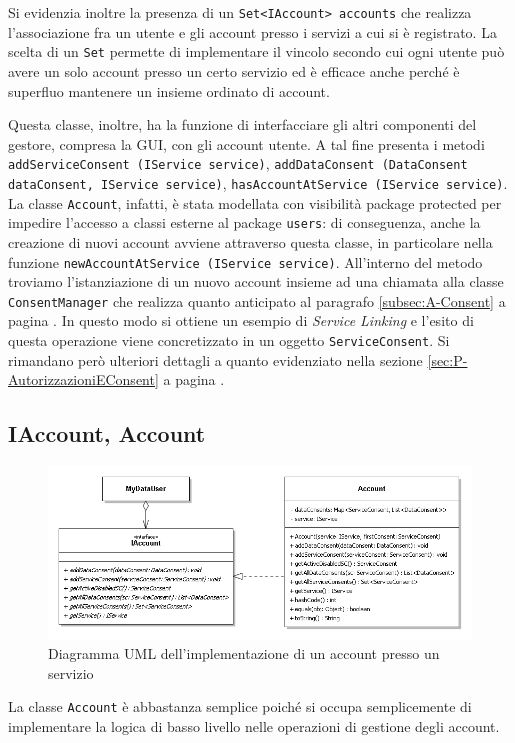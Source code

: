 Si evidenzia inoltre la presenza di un \texttt{Set<IAccount> accounts} che realizza l’associazione fra un utente e gli account presso i servizi a cui si \`e registrato. La scelta di un \texttt{Set} permette di implementare il vincolo secondo cui ogni utente pu\`o avere un solo account presso un certo servizio ed \`e efficace anche perch\'e \`e superfluo mantenere un insieme ordinato di account.

Questa classe, inoltre, ha la funzione di interfacciare gli altri componenti del gestore, compresa la GUI, con gli account utente. A tal fine presenta i metodi \texttt{addServiceConsent (IService service)}, \texttt{addDataConsent (DataConsent dataConsent, IService service)}, \texttt{hasAccountAtService (IService service)}.  La classe \texttt{Account}, infatti, \`e stata modellata con visibilit\`a package protected per impedire l’accesso a classi esterne al package \texttt{users}: di conseguenza, anche la creazione di nuovi account avviene attraverso questa classe, in particolare nella funzione \texttt{newAccountAtService (IService service)}. All’interno del metodo troviamo l’istanziazione di un nuovo account insieme ad una chiamata alla classe \texttt{ConsentManager} che realizza quanto anticipato al paragrafo \ref{subsec:A-Consent} a pagina \pageref{subsec:A-Consent}. In questo modo si ottiene un esempio di \textit{Service Linking} e l’esito di questa operazione viene concretizzato in un oggetto \texttt{ServiceConsent}. Si rimandano per\`o ulteriori dettagli a quanto evidenziato nella sezione \ref{sec:P-AutorizzazioniEConsent} a pagina \pageref{sec:P-AutorizzazioniEConsent}.

\subsection{IAccount, Account}
\label{subsec:P-Account}
\begin{figure} [h]
	\centering
	\includegraphics[width=0.95\linewidth]{pictures/Accounting-Account.png}
	\caption{Diagramma UML dell'implementazione di un account presso un servizio}
	\label{fig:Accounting-Account}
\end{figure}
La classe \texttt{Account} \`e abbastanza semplice poich\'e si occupa semplicemente di implementare la logica di basso livello nelle operazioni di gestione degli account.

